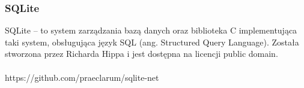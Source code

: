 \begin{frame}
\frametitle{SQLite}
SQLite – to system zarządzania bazą danych oraz biblioteka C implementująca taki system, obsługująca język SQL (ang. Structured Query Language). Została stworzona przez Richarda Hippa i jest dostępna na licencji public domain.\\
~\\
https://github.com/praeclarum/sqlite-net
\end{frame}

